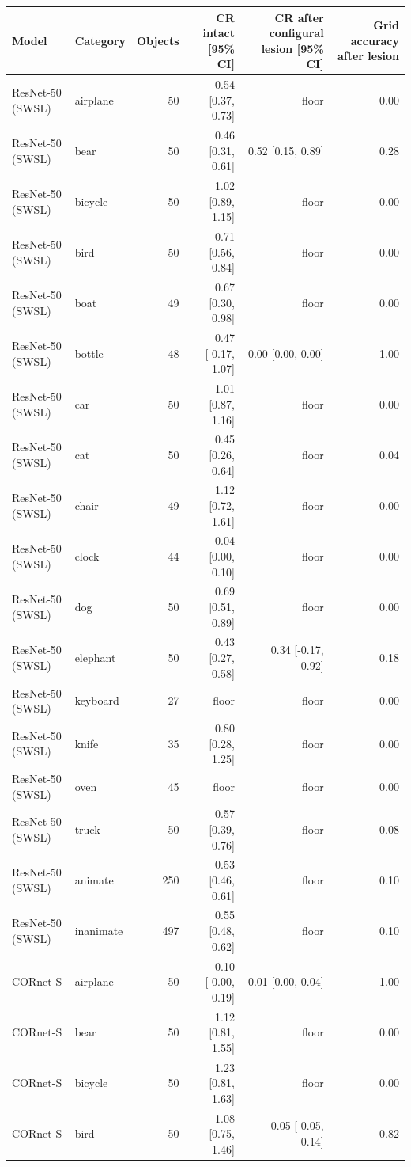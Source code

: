 \begin{tabular}{llrrrr}
\hline
Model & Category & Objects & CR intact [95\% CI] & CR after configural lesion [95\% CI] & Grid accuracy after lesion \\
\hline
ResNet-50 (SWSL) & airplane & 50 & 0.54 [0.37, 0.73] & floor & 0.00 \\
ResNet-50 (SWSL) & bear & 50 & 0.46 [0.31, 0.61] & 0.52 [0.15, 0.89] & 0.28 \\
ResNet-50 (SWSL) & bicycle & 50 & 1.02 [0.89, 1.15] & floor & 0.00 \\
ResNet-50 (SWSL) & bird & 50 & 0.71 [0.56, 0.84] & floor & 0.00 \\
ResNet-50 (SWSL) & boat & 49 & 0.67 [0.30, 0.98] & floor & 0.00 \\
ResNet-50 (SWSL) & bottle & 48 & 0.47 [-0.17, 1.07] & 0.00 [0.00, 0.00] & 1.00 \\
ResNet-50 (SWSL) & car & 50 & 1.01 [0.87, 1.16] & floor & 0.00 \\
ResNet-50 (SWSL) & cat & 50 & 0.45 [0.26, 0.64] & floor & 0.04 \\
ResNet-50 (SWSL) & chair & 49 & 1.12 [0.72, 1.61] & floor & 0.00 \\
ResNet-50 (SWSL) & clock & 44 & 0.04 [0.00, 0.10] & floor & 0.00 \\
ResNet-50 (SWSL) & dog & 50 & 0.69 [0.51, 0.89] & floor & 0.00 \\
ResNet-50 (SWSL) & elephant & 50 & 0.43 [0.27, 0.58] & 0.34 [-0.17, 0.92] & 0.18 \\
ResNet-50 (SWSL) & keyboard & 27 & floor & floor & 0.00 \\
ResNet-50 (SWSL) & knife & 35 & 0.80 [0.28, 1.25] & floor & 0.00 \\
ResNet-50 (SWSL) & oven & 45 & floor & floor & 0.00 \\
ResNet-50 (SWSL) & truck & 50 & 0.57 [0.39, 0.76] & floor & 0.08 \\
ResNet-50 (SWSL) & animate & 250 & 0.53 [0.46, 0.61] & floor & 0.10 \\
ResNet-50 (SWSL) & inanimate & 497 & 0.55 [0.48, 0.62] & floor & 0.10 \\
CORnet-S & airplane & 50 & 0.10 [-0.00, 0.19] & 0.01 [0.00, 0.04] & 1.00 \\
CORnet-S & bear & 50 & 1.12 [0.81, 1.55] & floor & 0.00 \\
CORnet-S & bicycle & 50 & 1.23 [0.81, 1.63] & floor & 0.00 \\
CORnet-S & bird & 50 & 1.08 [0.75, 1.46] & 0.05 [-0.05, 0.14] & 0.82 \\

\end{tabular}
